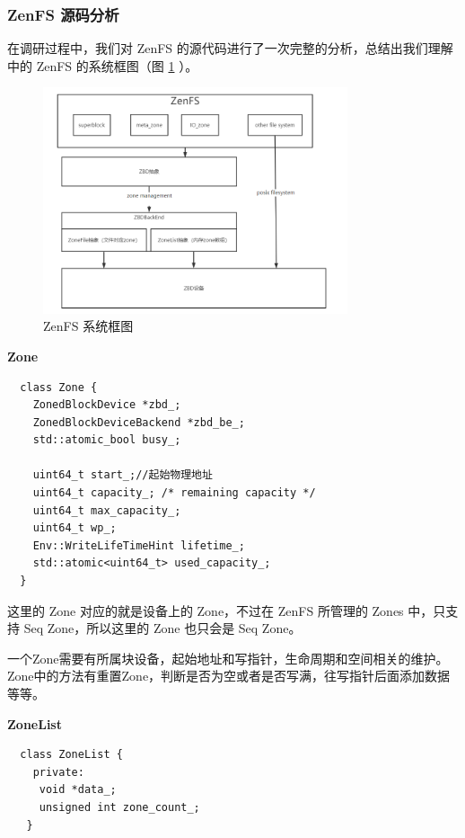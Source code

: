 \subsubsection{ZenFS 源码分析}

在调研过程中，我们对 ZenFS 的源代码进行了一次完整的分析，总结出我们理解中的 ZenFS 的系统框图（图 \ref{zenfs} ）。

\begin{figure}[htbp]
    \centering
    \includegraphics[width=0.8\textwidth]{fig/zenfs}
    \caption{ZenFS 系统框图}
    \label{zenfs}
\end{figure}

\textbf{Zone}

\begin{lstlisting}
  class Zone {
    ZonedBlockDevice *zbd_;
    ZonedBlockDeviceBackend *zbd_be_;
    std::atomic_bool busy_;
    
    uint64_t start_;//起始物理地址
    uint64_t capacity_; /* remaining capacity */
    uint64_t max_capacity_;
    uint64_t wp_;
    Env::WriteLifeTimeHint lifetime_;
    std::atomic<uint64_t> used_capacity_;
  }  
\end{lstlisting}

这里的 Zone 对应的就是设备上的 Zone，不过在 ZenFS 所管理的 Zones 中，只支持 Seq Zone，所以这里的 Zone 也只会是 Seq Zone。

一个Zone需要有所属块设备，起始地址和写指针，生命周期和空间相关的维护。
Zone中的方法有重置Zone，判断是否为空或者是否写满，往写指针后面添加数据等等。

\textbf{ZoneList}

\begin{lstlisting}
  class ZoneList {
    private:
     void *data_;
     unsigned int zone_count_;
   }   
\end{lstlisting}

